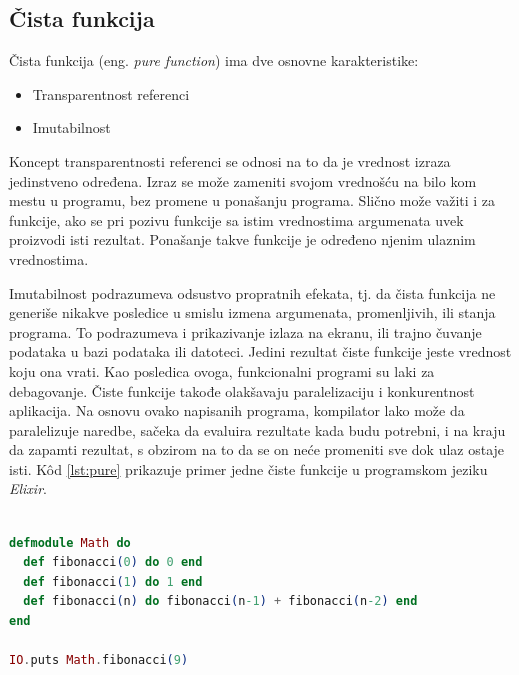\documentclass[12pt,oneside]{memoir}
\begin{document}
\subsection{Čista funkcija}
\par  Čista funkcija (eng. \textit{pure function}) ima dve osnovne karakteristike: 
\begin{itemize}
\item Transparentnost referenci 
\item Imutabilnost 
\end{itemize}
\par  Koncept transparentnosti referenci se odnosi na to da je vrednost izraza jedinstveno određena. Izraz se može zameniti svojom vrednošću na bilo kom mestu u programu, bez promene u ponašanju programa. Slično može važiti i za funkcije, ako se pri pozivu funkcije sa istim vrednostima argumenata uvek proizvodi isti rezultat. Ponašanje takve funkcije je određeno njenim ulaznim vrednostima.

\par Imutabilnost podrazumeva odsustvo propratnih efekata, tj. da čista funkcija ne generiše nikakve posledice u smislu izmena argumenata, promenljivih, ili stanja programa. To podrazumeva i prikazivanje izlaza na ekranu, ili trajno čuvanje podataka u bazi podataka ili datoteci. Jedini rezultat čiste funkcije jeste vrednost koju ona vrati. Kao posledica ovoga, funkcionalni programi su laki za debagovanje. Čiste funkcije takođe olakšavaju paralelizaciju i konkurentnost aplikacija. Na osnovu ovako napisanih programa, kompilator lako može da paralelizuje naredbe, sačeka da evaluira rezultate kada budu potrebni, i na kraju da zapamti rezultat, s obzirom na to da se on neće promeniti sve dok ulaz ostaje isti. K\^{o}d \ref{lst:pure} prikazuje primer jedne čiste funkcije u programskom jeziku \emph{Elixir}. \\

\begin{minipage}{\linewidth}
\begin{lstlisting}[language=elixir, basicstyle=\small, caption={Primer čiste funkcije},captionpos=b, label={lst:pure}]

defmodule Math do 
  def fibonacci(0) do 0 end
  def fibonacci(1) do 1 end
  def fibonacci(n) do fibonacci(n-1) + fibonacci(n-2) end
end

IO.puts Math.fibonacci(9)
\end{lstlisting}
\end{minipage}
\end{document}
